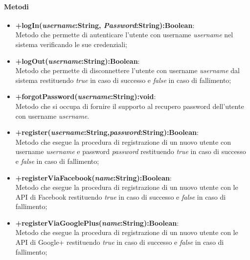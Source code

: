 \paragraph{Metodi}
\begin{itemize}
	\item \textbf{+logIn(\textit{username}:String, \textit{Password}:String):Boolean}:\\
	Metodo che permette di autenticare l'utente con username \textit{username} nel sistema verificando le sue credenziali;
	\item \textbf{+logOut(\textit{username}:String):Boolean}:\\
	Metodo che permette di disconnettere l'utente con username \textit{username} dal sistema restituendo \textit{true} in caso di successo e \textit{false} in caso di fallimento;
	\item \textbf{+forgotPassword(\textit{username}:String):void}:\\
	Metodo che si occupa di fornire il supporto al recupero password dell'utente con username \textit{username}.
	\item \textbf{+register(\textit{username}:String,\textit{password}:String):Boolean}:\\
	Metodo che esegue la procedura di registrazione di un nuovo utente con username \textit{username} e password \textit{password} restituendo \textit{true} in caso di successo e \textit{false} in caso di fallimento;
	\item \textbf{+registerViaFacebook(\textit{name}:String):Boolean}:\\
	Metodo che esegue la procedura di registrazione di un nuovo utente con le API di Facebook restituendo \textit{true} in caso di successo e \textit{false} in caso di fallimento;
	\item \textbf{+registerViaGooglePlus(\textit{name}:String):Boolean}:\\
	Metodo che esegue la procedura di registrazione di un nuovo utente con le API di Google+ restituendo \textit{true} in caso di successo e \textit{false} in caso di fallimento;
\end{itemize}
